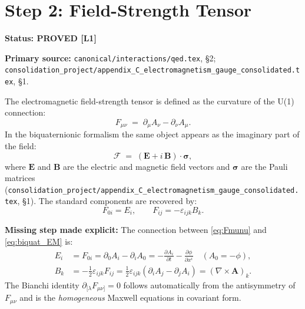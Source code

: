 \documentclass[11pt,a4paper]{article}
\newcommand{\Lone}{\textbf{[L1]}}
\newcommand{\PROVED}{\textbf{PROVED}}
\begin{document}
\section{Step 2: Field-Strength Tensor}

\noindent\textbf{Status: \PROVED{} \Lone}

\noindent\textbf{Primary source:}
\texttt{canonical/interactions/qed.tex}, \S2;
\texttt{consolidation\_project/appendix\_C\_electromagnetism\_gauge\_consolidated.tex}, \S1.

\medskip

The electromagnetic field-strength tensor is defined as the curvature of the
U(1) connection:
\begin{equation}\label{eq:Fmunu}
  F_{\mu\nu} \;=\; \partial_\mu A_\nu - \partial_\nu A_\mu.
\end{equation}
In the biquaternionic formalism the same object appears as the imaginary part
of the field:
\begin{equation}\label{eq:biquat_EM}
  \mathcal{F} \;=\; (\mathbf{E} + i\,\mathbf{B})\cdot\boldsymbol{\sigma},
\end{equation}
where $\mathbf{E}$ and $\mathbf{B}$ are the electric and magnetic field vectors
and $\boldsymbol{\sigma}$ are the Pauli matrices
(\texttt{consolidation\_project/appendix\_C\_electromagnetism\_gauge\_consolidated.tex}, \S1).
The standard components are recovered by:
\begin{equation}\label{eq:EB_from_F}
  F_{0i} = E_i, \qquad F_{ij} = -\varepsilon_{ijk}B_k.
\end{equation}

\noindent\textbf{Missing step made explicit:} The connection between
\eqref{eq:Fmunu} and \eqref{eq:biquat_EM} is:
\begin{align}
  E_i &= F_{0i} = \partial_0 A_i - \partial_i A_0
       = -\frac{\partial A_i}{\partial t} - \frac{\partial\phi}{\partial x^i}
       \quad (A_0 = -\phi), \label{eq:E_from_F} \\
  B_k &= -\tfrac{1}{2}\varepsilon_{ijk}F_{ij}
       = \tfrac{1}{2}\varepsilon_{ijk}(\partial_i A_j - \partial_j A_i)
       = (\nabla\times\mathbf{A})_k. \label{eq:B_from_F}
\end{align}
The Bianchi identity $\partial_{[\lambda}F_{\mu\nu]} = 0$ follows
automatically from the antisymmetry of $F_{\mu\nu}$ and is the
\emph{homogeneous} Maxwell equations in covariant form.
\end{document}
